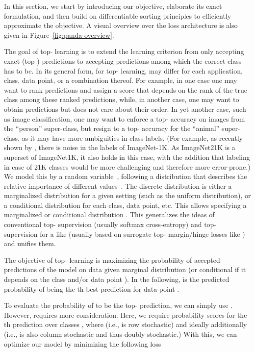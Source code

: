 \documentclass{article}
\begin{document}
In this section, we start by introducing our objective, elaborate its exact formulation, and then build on differentiable sorting principles to efficiently approximate the objective.
A visual overview over the loss architecture is also given in Figure~\ref{fig:panda-overview}.

The goal of top- learning is to extend the learning criterion from only accepting exact (top-) predictions to accepting  predictions among which the correct class has to be.
In its general form, for top- learning,  may differ for each application, class, data point, or a combination thereof. 
For example, in one case one may want to rank  predictions and assign a score that depends on the rank of the true class among these ranked predictions, while, in another case, one may want to obtain  predictions but does not care about their order.
In yet another case, such as image classification, one may want to enforce a top- accuracy on images from the ``person'' super-class, but resign to a top- accuracy for the ``animal'' super-class, as it may have more ambiguities in class-labels.
(For example, as recently shown by \citet{northcutt2021pervasive}, there is noise in the labels of ImageNet-1K. 
As ImageNet21K is a superset of ImageNet1K, it also holds in this case, with the addition that labeling in case of 21K classes would be more challenging and therefore more error-prone.)
We model this by a random variable~, following a distribution  that describes the relative importance of different values~. 
The discrete distribution  is either a marginalized distribution for a given setting (such as the uniform distribution), or a conditional distribution for each class, data point, etc. 
This allows specifying a marginalized or conditional distribution . 
This generalizes the ideas of conventional top- supervision (usually softmax cross-entropy) and top- supervision for a  like  (usually based on surrogate top- margin/hinge losses like \citep{lapin2016loss, berrada2018smooth}) and unifies them.

The objective of top- learning is maximizing the probability of accepted predictions of the model  on data  given marginal distribution  (or conditional  if it depends on the class  and/or data point ). In the following,  is the predicted probability of  being the th-best prediction for data point .

To evaluate the probability of  to be the top- prediction, we can simply use .
However,  requires more consideration. 
Here, we require probability scores  for the th prediction over classes , where  (i.e.,  is row stochastic) and ideally additionally  (i.e.,  is also column stochastic and thus doubly stochastic.)
With this, we can optimize our model by minimizing the following loss
\end{document}
